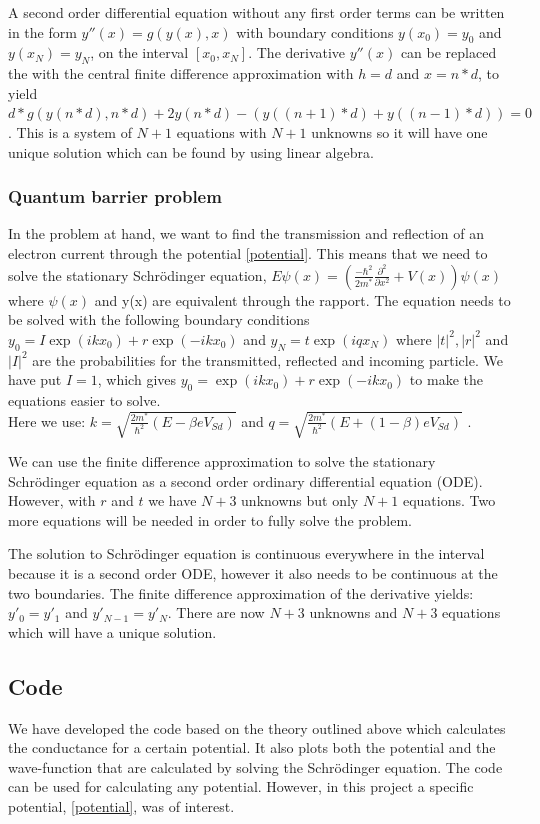 \documentclass[a4paper]{article}
\begin{document}
A second order differential equation without any first order terms can be written in the form $y''(x) = g(y(x),x)$ with boundary conditions $y(x_{0}) = y_{0}$ and $y(x_{N}) = y_{N}$, on the interval $[x_{0},x_{N}]$. The derivative $y''(x)$ can be replaced the with the central finite difference approximation with $h = d$ and $x = n*d$, to yield $d*g(y(n*d),n*d) + 2y(n*d)-(y((n+1)*d)+y((n-1)*d)) = 0$. This is a system of $N+1$ equations with $N+1$ unknowns so it will have one unique solution which can be found by using linear algebra.

\subsubsection{Quantum barrier problem}

In the problem at hand, we want to find the transmission and reflection of an electron current through the potential \eqref{potential}. This means that we need to solve the stationary Schr\"odinger equation, $ E \psi (x) = (\frac{-\hbar ^2}{2m^*} \frac{\partial^2}{\partial x^2} +V(x)) \psi (x)$ where $\psi (x)$ and y(x) are equivalent through the rapport. The equation needs to be solved with the following boundary conditions $y_{0} = I\exp{(ik x_{0})} + r\exp{(-i k x_{0})}$ and $y_{N} = t\exp{(i q x_{N})}$ where $|t|^2,|r|^2$ and $|I|^2$ are the probabilities for the transmitted, reflected and incoming particle. We have put $I=1$, which gives $y_{0} = \exp{(ik x_{0})} + r\exp{(-i k x_{0})}$ to make the equations easier to solve. \\Here we use: $k=\sqrt{\frac{2m^*}{\hbar^2}(E-\beta e V_{Sd})}$ and $q=\sqrt{\frac{2m^*}{\hbar^2}(E+ (1-\beta) e V_{Sd})}$ .

We can use the finite difference approximation to solve the stationary \\Schr\"odinger equation as a second order ordinary differential equation (ODE). However, with $r$ and $t$ we have $N+3$ unknowns but only $N+1$ equations. Two more equations will be needed in order to fully solve the problem.

The solution to Schr\"odinger equation is continuous everywhere in the interval because it is a second order ODE, however it also needs to be continuous at the two boundaries. The finite difference approximation of the derivative yields: $y'_{0}=y'_{1}$ and $y'_{N-1}=y'_{N}$. There are now $N+3$ unknowns and $N+3$ equations which will have a unique solution.


\subsection{Code}
We have developed the code based on the theory outlined above which calculates the conductance for a certain potential. It also plots both the potential and the wave-function that are calculated by solving the Schr\"odinger equation.
The code can be used for calculating any potential. However, in this project a specific potential, \eqref{potential}, was of interest.
\end{document}
